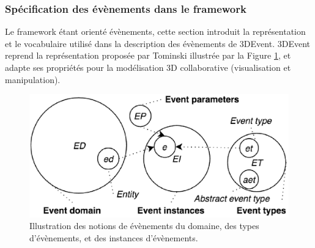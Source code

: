 \subsubsection{Spécification des évènements dans le framework}
Le framework étant orienté évènements, cette section introduit la représentation et 
le vocabulaire utilisé dans la description des évènements de 3DEvent. 3DEvent 
reprend la représentation proposée par Tominski \cite{Doktor-ingenieur2006} 
illustrée par la Figure \ref{fig:representation_event}, et adapte ses propriétés pour 
la modélisation 3D collaborative (visualisation et manipulation). 

\begin{figure}[ht]
	\centering
	\includegraphics[width=0.7\columnwidth]{eps/event4.eps}
	\caption{Illustration des notions de évènements du domaine, des types 
		d'évènements, et des instances d'évènements.}
	\label{fig:representation_event}
\end{figure}

